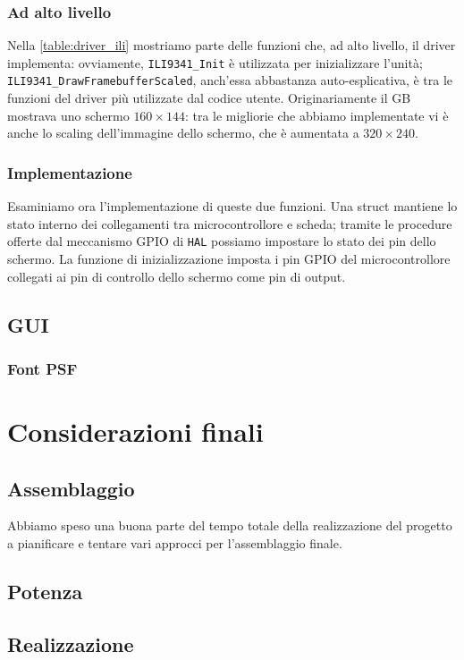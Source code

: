 \documentclass[hidelinks,12pt]{article}
\begin{document}
\subsubsection{Ad alto livello}
Nella \cref{table:driver_ili} mostriamo parte delle funzioni che, ad alto
livello, il driver implementa: ovviamente, \texttt{ILI9341\_Init} è utilizzata
per inizializzare l'unità; \texttt{ILI9341\_DrawFramebufferScaled}, anch'essa
abbastanza auto-esplicativa, è tra le funzioni del driver più utilizzate dal
codice utente. Originariamente il GB mostrava uno schermo $160\times144$: tra le
migliorie che abbiamo implementate vi è anche lo scaling dell'immagine dello
schermo, che è aumentata a $320\times240$.

\subsubsection{Implementazione}
Esaminiamo ora l'implementazione di queste due funzioni. Una struct mantiene lo
stato interno dei collegamenti tra microcontrollore e scheda; tramite le
procedure offerte dal meccanismo GPIO di \texttt{HAL} possiamo impostare lo
stato dei pin dello schermo. La funzione di inizializzazione imposta i pin GPIO
del microcontrollore collegati ai pin di controllo dello schermo come pin di
output.  


\subsection{GUI}
\subsubsection{Font PSF}

\section{Considerazioni finali}
\subsection{Assemblaggio}
Abbiamo speso una buona parte del tempo totale della realizzazione del progetto
a pianificare e tentare vari approcci per l'assemblaggio finale.
\subsection{Potenza}
\subsection{Realizzazione}




\nocite{*}
\printbibliography
\end{document}
